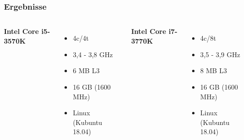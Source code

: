\documentclass[aspectratio=169]{beamer}
\begin{document}
\begin{frame}
	\frametitle{Ergebnisse}
	\begin{columns}[c] %
		
		\textbf{Intel Core i5-3570K}
		\begin{itemize}
			\item 4c/4t
			\item 3,4 - 3,8 GHz
			\item 6 MB L3
			\item 16 GB (1600 MHz)
			\item Linux (Kubuntu 18.04)
		\end{itemize}
		
		\textbf{Intel Core i7-3770K}
		\begin{itemize}
			\item 4c/8t
			\item 3,5 - 3,9 GHz
			\item 8 MB L3
			\item 16 GB (1600 MHz)
			\item Linux (Kubuntu 18.04)
			
		\end{itemize}
	\end{columns}
\end{frame}
	

\end{document}
